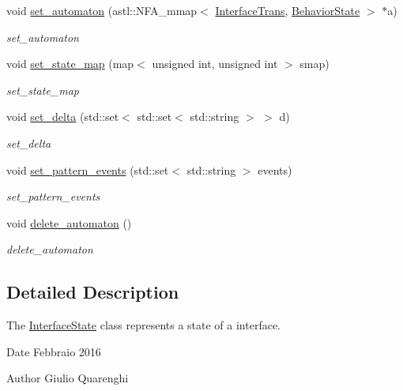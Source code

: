 \begin{DoxyCompactItemize}
void \hyperlink{class_interface_state_a16ac870e8a41f8fbb33f158b147c5aa6}{set\+\_\+automaton} (astl\+::\+N\+F\+A\+\_\+mmap$<$ \hyperlink{class_interface_trans}{Interface\+Trans}, \hyperlink{class_behavior_state}{Behavior\+State} $>$ $\ast$a)
\begin{DoxyCompactList}\small\item\em set\+\_\+automaton \end{DoxyCompactList}\item 
void \hyperlink{class_interface_state_a7e802f245b441b436aeedf189adcfc71}{set\+\_\+state\+\_\+map} (map$<$ unsigned int, unsigned int $>$ smap)
\begin{DoxyCompactList}\small\item\em set\+\_\+state\+\_\+map \end{DoxyCompactList}\item 
void \hyperlink{class_interface_state_a83fe4690229e40c6d15d760fef315e01}{set\+\_\+delta} (std\+::set$<$ std\+::set$<$ std\+::string $>$ $>$ d)
\begin{DoxyCompactList}\small\item\em set\+\_\+delta \end{DoxyCompactList}\item 
void \hyperlink{class_interface_state_acca071078d49608b5dd827182f6bae49}{set\+\_\+pattern\+\_\+events} (std\+::set$<$ std\+::string $>$ events)
\begin{DoxyCompactList}\small\item\em set\+\_\+pattern\+\_\+events \end{DoxyCompactList}\item 
void \hyperlink{class_interface_state_af42783492e664a708effdb155857315b}{delete\+\_\+automaton} ()\hypertarget{class_interface_state_af42783492e664a708effdb155857315b}{}\label{class_interface_state_af42783492e664a708effdb155857315b}

\begin{DoxyCompactList}\small\item\em delete\+\_\+automaton \end{DoxyCompactList}\end{DoxyCompactItemize}


\subsection{Detailed Description}
The \hyperlink{class_interface_state}{Interface\+State} class represents a state of a interface. 

\begin{DoxyDate}{Date}
Febbraio 2016 
\end{DoxyDate}
\begin{DoxyAuthor}{Author}
Giulio Quarenghi 
\end{DoxyAuthor}



